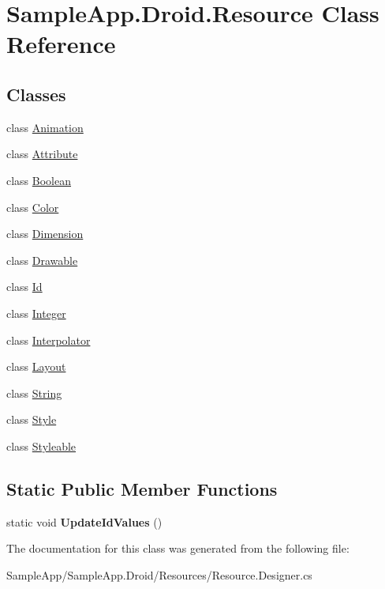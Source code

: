 \hypertarget{class_sample_app_1_1_droid_1_1_resource}{}\section{Sample\+App.\+Droid.\+Resource Class Reference}
\label{class_sample_app_1_1_droid_1_1_resource}
\subsection*{Classes}
\begin{DoxyCompactItemize}
\item 
class \hyperlink{class_sample_app_1_1_droid_1_1_resource_1_1_animation}{Animation}
\item 
class \hyperlink{class_sample_app_1_1_droid_1_1_resource_1_1_attribute}{Attribute}
\item 
class \hyperlink{class_sample_app_1_1_droid_1_1_resource_1_1_boolean}{Boolean}
\item 
class \hyperlink{class_sample_app_1_1_droid_1_1_resource_1_1_color}{Color}
\item 
class \hyperlink{class_sample_app_1_1_droid_1_1_resource_1_1_dimension}{Dimension}
\item 
class \hyperlink{class_sample_app_1_1_droid_1_1_resource_1_1_drawable}{Drawable}
\item 
class \hyperlink{class_sample_app_1_1_droid_1_1_resource_1_1_id}{Id}
\item 
class \hyperlink{class_sample_app_1_1_droid_1_1_resource_1_1_integer}{Integer}
\item 
class \hyperlink{class_sample_app_1_1_droid_1_1_resource_1_1_interpolator}{Interpolator}
\item 
class \hyperlink{class_sample_app_1_1_droid_1_1_resource_1_1_layout}{Layout}
\item 
class \hyperlink{class_sample_app_1_1_droid_1_1_resource_1_1_string}{String}
\item 
class \hyperlink{class_sample_app_1_1_droid_1_1_resource_1_1_style}{Style}
\item 
class \hyperlink{class_sample_app_1_1_droid_1_1_resource_1_1_styleable}{Styleable}
\end{DoxyCompactItemize}
\subsection*{Static Public Member Functions}
\begin{DoxyCompactItemize}
\item 
\mbox{\label{class_sample_app_1_1_droid_1_1_resource_ae8a09962d3ac20ddb510f497e0c479e4}} 
static void {\bfseries Update\+Id\+Values} ()
\end{DoxyCompactItemize}


The documentation for this class was generated from the following file\+:\begin{DoxyCompactItemize}
\item 
Sample\+App/\+Sample\+App.\+Droid/\+Resources/Resource.\+Designer.\+cs\end{DoxyCompactItemize}
